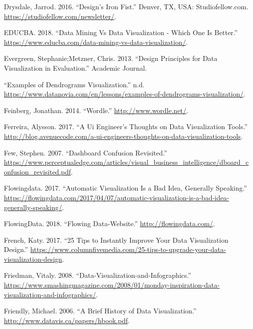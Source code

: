 \documentclass[]{book}
\begin{document}
\leavevmode\hypertarget{ref-Design_Iron_Fist}{}%
Drysdale, Jarrod. 2016. ``Design's Iron Fist.'' Denver, TX, USA: Studiofellow.com. \url{https://studiofellow.com/newsletter/}.

\leavevmode\hypertarget{ref-data_mining}{}%
EDUCBA. 2018. ``Data Mining Vs Data Visualization - Which One Is Better.'' \url{https://www.educba.com/data-mining-vs-data-visualization/}.

\leavevmode\hypertarget{ref-Steph}{}%
Evergreen, Stephanie;Metzner, Chris. 2013. ``Design Principles for Data Visualization in Evaluation.'' Academic Journal.

\leavevmode\hypertarget{ref-dendrogram-diag}{}%
``Examples of Dendrograms Visualization.'' n.d. \url{https://www.datanovia.com/en/lessons/examples-of-dendrograms-visualization/}.

\leavevmode\hypertarget{ref-wordle}{}%
Feinberg, Jonathan. 2014. ``Wordle.'' \url{http://www.wordle.net/}.

\leavevmode\hypertarget{ref-UI_engineer}{}%
Ferreira, Alysson. 2017. ``A Ui Engineer's Thoughts on Data Visualization Tools.'' \url{http://blog.avenuecode.com/a-ui-engineers-thoughts-on-data-visualization-tools}.

\leavevmode\hypertarget{ref-dashboard}{}%
Few, Stephen. 2007. ``Dashboard Confusion Revisited.'' \url{https://www.perceptualedge.com/articles/visual_business_intelligence/dboard_confusion_revisited.pdf}.

\leavevmode\hypertarget{ref-auto_viz}{}%
Flowingdata. 2017. ``Automatic Visualization Is a Bad Idea, Generally Speaking.'' \url{https://flowingdata.com/2017/04/07/automatic-visualization-is-a-bad-idea-generally-speaking/}.

\leavevmode\hypertarget{ref-flowingdata}{}%
FlowingData. 2018. ``Flowing Data-Website.'' \url{http://flowingdata.com/}.

\leavevmode\hypertarget{ref-French}{}%
French, Katy. 2017. ``25 Tips to Instantly Improve Your Data Visualization Design.'' \url{https://www.columnfivemedia.com/25-tips-to-upgrade-your-data-visualization-design}.

\leavevmode\hypertarget{ref-viz}{}%
Friedman, Vitaly. 2008. ``Data-Visualization-and-Infographics.'' \url{https://www.smashingmagazine.com/2008/01/monday-inspiration-data-visualization-and-infographics/}.

\leavevmode\hypertarget{ref-data_viz_history}{}%
Friendly, Michael. 2006. ``A Brief History of Data Visualization.'' \url{http://www.datavis.ca/papers/hbook.pdf}.
\end{document}

